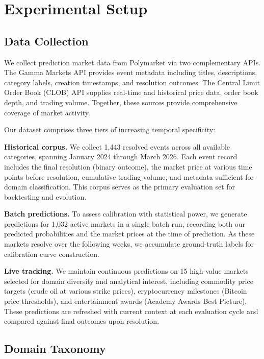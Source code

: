 \section{Experimental Setup}
\label{sec:exp}

\subsection{Data Collection}

We collect prediction market data from Polymarket via two complementary APIs. The Gamma Markets API provides event metadata including titles, descriptions, category labels, creation timestamps, and resolution outcomes. The Central Limit Order Book (CLOB) API supplies real-time and historical price data, order book depth, and trading volume. Together, these sources provide comprehensive coverage of market activity.

Our dataset comprises three tiers of increasing temporal specificity:

\textbf{Historical corpus.} We collect 1{,}443 resolved events across all available categories, spanning January 2024 through March 2026. Each event record includes the final resolution (binary outcome), the market price at various time points before resolution, cumulative trading volume, and metadata sufficient for domain classification. This corpus serves as the primary evaluation set for backtesting and evolution.

\textbf{Batch predictions.} To assess calibration with statistical power, we generate predictions for 1{,}032 active markets in a single batch run, recording both our predicted probabilities and the market prices at the time of prediction. As these markets resolve over the following weeks, we accumulate ground-truth labels for calibration curve construction.

\textbf{Live tracking.} We maintain continuous predictions on 15 high-value markets selected for domain diversity and analytical interest, including commodity price targets (crude oil at various strike prices), cryptocurrency milestones (Bitcoin price thresholds), and entertainment awards (Academy Awards Best Picture). These predictions are refreshed with current context at each evaluation cycle and compared against final outcomes upon resolution.

\subsection{Domain Taxonomy}

